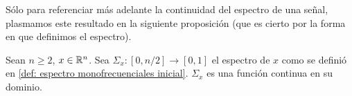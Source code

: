 Sólo para referenciar más adelante la continuidad del espectro de una 
señal, plasmamos este resultado en la siguiente proposición
(que es cierto por la forma en que definimos el espectro).

\begin{prop}
\label{prop: continuidad espctro espacois monof.}
Sean $n \geq 2$, $x \in \mathbb{R}^{n}$.
Sea $\Sigma_{x}:[0, n/2] \rightarrow [0,1]$ el espectro 
de $x$ como se definió en 
\ref{def: espectro monofrecuenciales inicial}.
$\Sigma_{x}$ es una función continua en su dominio.
\end{prop}

